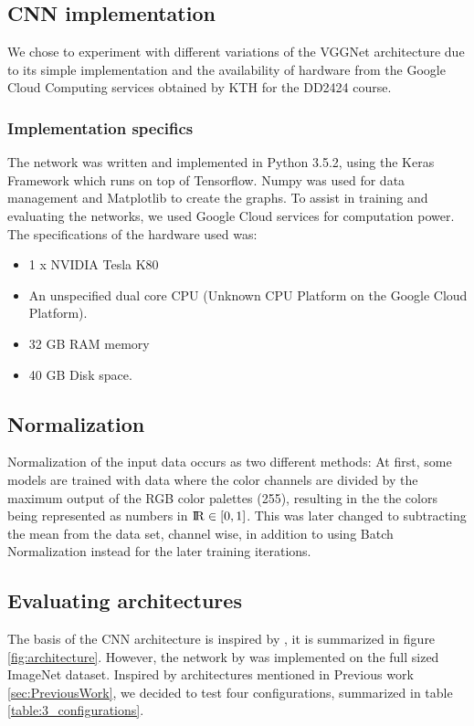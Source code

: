 \documentclass{kthreport}
\begin{document}
\subsection{CNN implementation}

We chose to experiment with different variations of the VGGNet architecture due to its simple implementation and the availability of hardware from the Google Cloud Computing services obtained by KTH for the DD2424 course.

\subsubsection{Implementation specifics}

The network was written and implemented in Python 3.5.2, using the Keras Framework which runs on top of Tensorflow. Numpy was used for data management and Matplotlib to create the graphs. To assist in training and evaluating the networks, we used Google Cloud services for computation power. The specifications of the hardware used was:

\begin{itemize}
  \item 1 x NVIDIA Tesla K80
  \item An unspecified dual core CPU (Unknown CPU Platform on the Google Cloud Platform).
  \item 32 GB RAM memory
  \item 40 GB Disk space.
\end{itemize}

\subsection{Normalization}
Normalization of the input data occurs as two different methods: At first, some models are trained with data where the color channels are divided by the maximum output of the RGB color palettes (255), resulting in the the colors being represented as numbers in ${\rm I\!R} \in [0,1]$.
This was later changed to subtracting the mean from the data set, channel wise, in addition to using Batch Normalization instead for the later training iterations.

\subsection{Evaluating architectures}

The basis of the CNN architecture is inspired by \cite{NIPS2012_4824}, it is summarized in figure \ref{fig:architecture}. However, the network by \cite{NIPS2012_4824} was implemented on the full sized ImageNet dataset. Inspired by architectures mentioned in Previous work \ref{sec:PreviousWork}, we decided to test four configurations, summarized in table \ref{table:3_configurations}.
\end{document}
